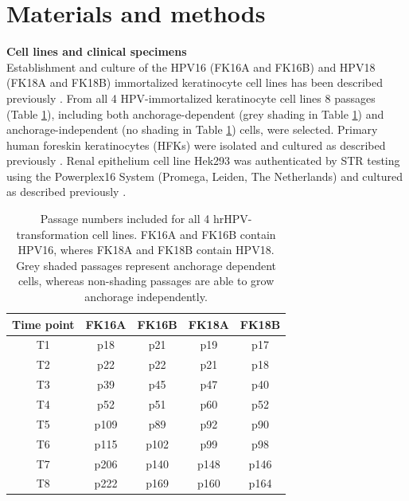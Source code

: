 \section{Materials and methods}

\textbf{Cell lines and clinical specimens}
\\
Establishment and culture of the HPV16 (FK16A and FK16B) and HPV18 (FK18A and FK18B) immortalized keratinocyte cell lines has been described previously \cite{Steenbergen1996}. From all 4 HPV-immortalized keratinocyte cell lines 8 passages (Table \ref{table:table51}), including both anchorage-dependent (grey shading in Table \ref{table:table51}) and anchorage-independent (no shading in Table \ref{table:table51}) cells, were selected. Primary human foreskin keratinocytes (HFKs) were isolated and cultured as described previously \cite{Steenbergen1996}. Renal epithelium cell line Hek293 was authenticated by STR testing using the Powerplex16 System (Promega, Leiden, The Netherlands) and cultured as described previously \cite{Snellenberg2014}.
\begin{table}[htbp]
  \centering
  \caption{Passage numbers included for all 4 hrHPV-transformation cell lines. FK16A and FK16B contain HPV16, wheres FK18A and FK18B contain HPV18. Grey shaded passages represent anchorage dependent cells, whereas non-shading passages are able to grow anchorage independently.
}
    \begin{tabular}{ccccc}
    \hline\hline
    \textbf{Time point} & \textbf{FK16A } & \textbf{FK16B } & \textbf{FK18A } & \textbf{FK18B } \\
    \hline
    T1    & \cellcolor[rgb]{ .753,  .753,  .753}p18 & \cellcolor[rgb]{ .753,  .753,  .753}p21 & \cellcolor[rgb]{ .753,  .753,  .753}p19 & \cellcolor[rgb]{ .753,  .753,  .753}p17 \\
    T2    & \cellcolor[rgb]{ .753,  .753,  .753}p22 & \cellcolor[rgb]{ .753,  .753,  .753}p22 & \cellcolor[rgb]{ .753,  .753,  .753}p21 & \cellcolor[rgb]{ .753,  .753,  .753}p18 \\
    T3    & \cellcolor[rgb]{ .753,  .753,  .753}p39 & p45   & p47   & p40 \\
    T4    & \cellcolor[rgb]{ .753,  .753,  .753}p52 & p51   & p60   & p52 \\
    T5    & p109  & p89   & p92   & p90 \\
    T6    & p115  & p102  & p99   & p98 \\
    T7    & p206  & p140  & p148  & p146 \\
    T8    & p222  & p169  & p160  & p164 \\
    \hline\hline
    \end{tabular}%
  \label{table:table51}%
\end{table}%
